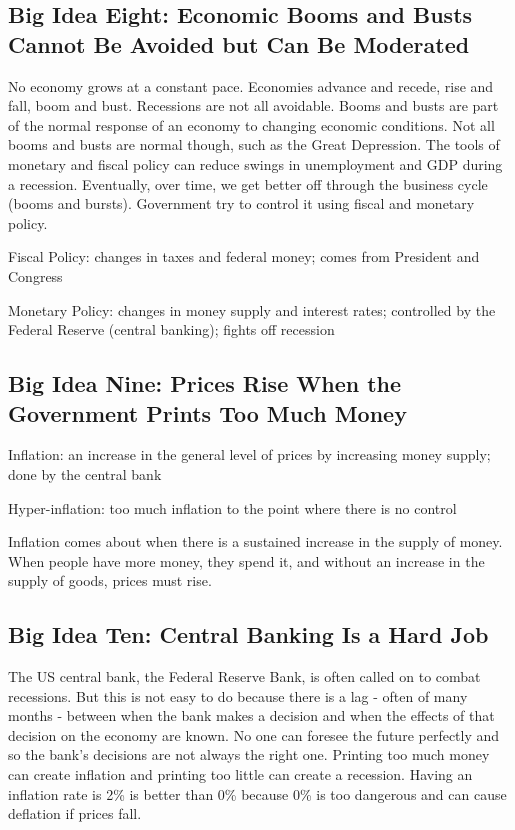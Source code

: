 \documentclass[12pt]{article}
\begin{document}
\subsection{Big Idea Eight: Economic Booms and Busts Cannot Be Avoided but Can Be Moderated} 
No economy grows at a constant pace. Economies advance and recede, rise and fall, boom and bust. Recessions are not all avoidable. Booms and busts are part of the normal response of an economy to changing economic conditions. Not all booms and busts are normal though, such as the Great Depression. The tools of monetary and fiscal policy can reduce swings in unemployment and GDP during a recession. Eventually, over time, we get better off through the business cycle (booms and bursts). Government try to control it using fiscal and monetary policy. 
\begin{definition} Fiscal Policy: changes in taxes and federal money; comes from President and Congress \end{definition}
\begin{definition} Monetary Policy: changes in money supply and interest rates; controlled by the Federal Reserve (central banking); fights off recession \end{definition}

\subsection{Big Idea Nine: Prices Rise When the Government Prints Too Much Money} 
\begin{definition} Inflation: an increase in the general level of prices by increasing money supply; done by the central bank \end{definition}

\begin{definition} Hyper-inflation: too much inflation to the point where there is no control \end{definition} 
Inflation comes about when there is a sustained increase in the supply of money. When people have more money, they spend it, and without an increase in the supply of goods, prices must rise. 

\subsection{Big Idea Ten: Central Banking Is a Hard Job} 
The US central bank, the Federal Reserve Bank, is often called on to combat recessions. But this is not easy to do because there is a lag - often of many months - between when the bank makes a decision and when the effects of that decision on the economy are known. No one can foresee the future perfectly and so the bank's decisions are not always the right one. 
Printing too much money can create inflation and printing too little can create a recession. Having an inflation rate is 2\% is better than 0\% because 0\% is too dangerous and can cause deflation if prices fall. 
\end{document}
